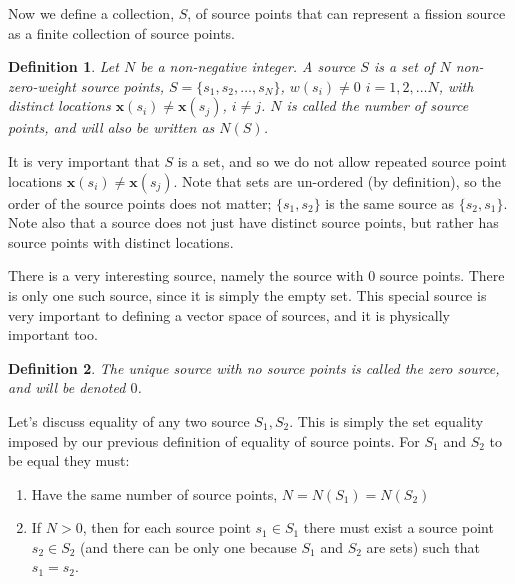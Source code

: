 \documentclass[12pt]{article}
\newtheorem{definition}{Definition}
\begin{document}
Now we define a collection,  $S$, of source points that can represent a fission source as a finite collection of source points.
\begin{definition}
Let $N$ be a non-negative integer.  A \emph{source} $S$ is a set of $N$ non-zero-weight source points, $S = \{s_1, s_2, \ldots, s_N\}$, $w(s_i) \ne 0$ $i = 1, 2, \ldots N$, with distinct locations $\mathbf{x}(s_i) \ne \mathbf{x}(s_j)$, $i \ne j$.  $N$ is called the number of source points, and will also be written as $N(S)$.
\end{definition}
It is very important that $S$ is a set, and so we do not allow repeated source point locations $\mathbf{x}(s_i) \ne \mathbf{x}(s_j)$. Note that sets are un-ordered (by definition), so the order of the source points does not matter; $\{s_1, s_2\}$ is the same source as $\{s_2, s_1\}$.  Note also that a source does not just have distinct source points, but rather has source points with distinct locations.

There is a very interesting source, namely the source with $0$ source points.  There is only one such source, since it is simply the empty set.  This special source is very important to defining a vector space of sources, and it is physically important too.
\begin{definition}
The unique source with no source points is called the \emph{zero source, and will be denoted $0$}.
\end{definition}

Let's discuss equality of any two source $S_1, S_2$.  This is simply the set equality imposed by our previous definition of equality of source points.   For $S_1$ and $S_2$ to be equal they must:
\begin{enumerate}
\item Have the same number of source points, $N = N(S_1) = N(S_2)$
\item If $N > 0$, then for each source point $s_1 \in S_1$ there must exist a source point $s_2 \in S_2$ (and there can be only one because $S_1$ and $S_2$ are sets) such that $s_1 = s_2$. 
\end{enumerate}
\end{document}
